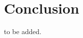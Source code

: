 \documentclass[12pt]{article} %
\begin{document}
\section{Conclusion}
to be added.



\end{document}
